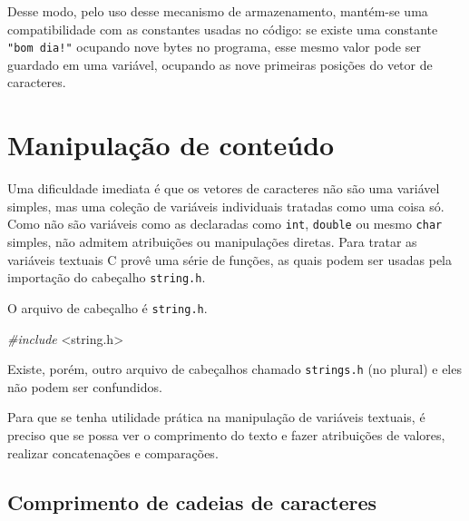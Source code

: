 \documentclass[
  11pt,
  a4paper,
]{scrbook}
\newenvironment{Shaded}{\begin{snugshade}}{\end{snugshade}}
\newcommand{\ImportTok}[1]{#1}
\newcommand{\PreprocessorTok}[1]{\textcolor[rgb]{0.56,0.35,0.01}{\textit{#1}}}
\begin{document}
Desse modo, pelo uso desse mecanismo de armazenamento, mantém-se uma
compatibilidade com as constantes usadas no código: se existe uma
constante \texttt{"bom\ dia!"} ocupando nove bytes no programa, esse
mesmo valor pode ser guardado em uma variável, ocupando as nove
primeiras posições do vetor de caracteres.

\section{Manipulação de
conteúdo}\label{manipulauxe7uxe3o-de-conteuxfado}

Uma dificuldade imediata é que os vetores de caracteres não são uma
variável simples, mas uma coleção de variáveis individuais tratadas como
uma coisa só. Como não são variáveis como as declaradas como
\texttt{int}, \texttt{double} ou mesmo \texttt{char} simples, não
admitem atribuições ou manipulações diretas. Para tratar as variáveis
textuais C provê uma série de funções, as quais podem ser usadas pela
importação do cabeçalho \texttt{string.h}.

\begin{tcolorbox}[enhanced jigsaw, arc=.35mm, bottomtitle=1mm, colbacktitle=quarto-callout-tip-color!10!white, title=\textcolor{quarto-callout-tip-color}{\faLightbulb}\hspace{0.5em}{Dica}, toprule=.15mm, left=2mm, opacityback=0, colback=white, colframe=quarto-callout-tip-color-frame, opacitybacktitle=0.6, bottomrule=.15mm, leftrule=.75mm, toptitle=1mm, coltitle=black, titlerule=0mm, rightrule=.15mm, breakable]

O arquivo de cabeçalho é \texttt{string.h}.

\begin{Shaded}
\begin{Highlighting}[]
\PreprocessorTok{\#include }\ImportTok{\textless{}string.h\textgreater{}}
\end{Highlighting}
\end{Shaded}

Existe, porém, outro arquivo de cabeçalhos chamado \texttt{strings.h}
(no plural) e eles não podem ser confundidos.

\end{tcolorbox}

Para que se tenha utilidade prática na manipulação de variáveis
textuais, é preciso que se possa ver o comprimento do texto e fazer
atribuições de valores, realizar concatenações e comparações.

\subsection{Comprimento de cadeias de
caracteres}\label{comprimento-de-cadeias-de-caracteres}
\end{document}
